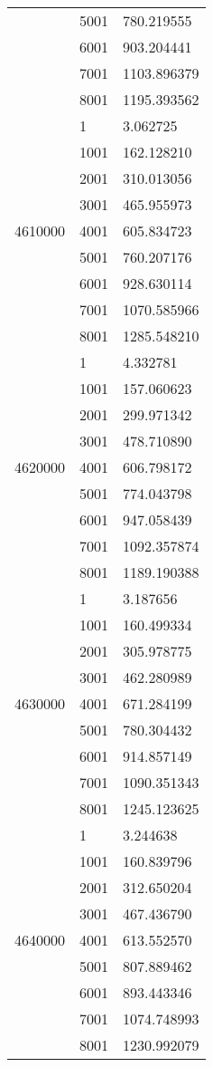 \begin{table}[htb!]
\begin{tabular}{lll}
 & 5001 & 780.219555 \\
 & 6001 & 903.204441 \\
 & 7001 & 1103.896379 \\
 & 8001 & 1195.393562 \\
\multirow[c]{9}{*}{4610000} & 1 & 3.062725 \\
 & 1001 & 162.128210 \\
 & 2001 & 310.013056 \\
 & 3001 & 465.955973 \\
 & 4001 & 605.834723 \\
 & 5001 & 760.207176 \\
 & 6001 & 928.630114 \\
 & 7001 & 1070.585966 \\
 & 8001 & 1285.548210 \\
\multirow[c]{9}{*}{4620000} & 1 & 4.332781 \\
 & 1001 & 157.060623 \\
 & 2001 & 299.971342 \\
 & 3001 & 478.710890 \\
 & 4001 & 606.798172 \\
 & 5001 & 774.043798 \\
 & 6001 & 947.058439 \\
 & 7001 & 1092.357874 \\
 & 8001 & 1189.190388 \\
\multirow[c]{9}{*}{4630000} & 1 & 3.187656 \\
 & 1001 & 160.499334 \\
 & 2001 & 305.978775 \\
 & 3001 & 462.280989 \\
 & 4001 & 671.284199 \\
 & 5001 & 780.304432 \\
 & 6001 & 914.857149 \\
 & 7001 & 1090.351343 \\
 & 8001 & 1245.123625 \\
\multirow[c]{9}{*}{4640000} & 1 & 3.244638 \\
 & 1001 & 160.839796 \\
 & 2001 & 312.650204 \\
 & 3001 & 467.436790 \\
 & 4001 & 613.552570 \\
 & 5001 & 807.889462 \\
 & 6001 & 893.443346 \\
 & 7001 & 1074.748993 \\
 & 8001 & 1230.992079 \\

\end{tabular}
\end{table}
